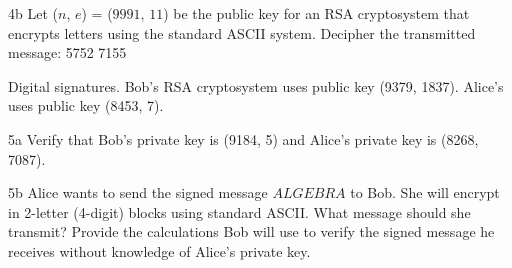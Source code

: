 
\begin{question}{4b}
Let ($n$, $e$) = ($9991$, $11$) be the public key for an RSA cryptosystem that encrypts
letters using the standard ASCII system. Decipher the transmitted message: 5752 7155
\end{question}


\begin{question}{5}
Digital signatures. Bob's RSA cryptosystem uses public key (9379, 1837). Alice's uses
public key (8453, 7).
\end{question}


\begin{question}{5a}
Verify that Bob's private key is (9184, 5) and Alice's private key is (8268, 7087).
\end{question}


\begin{question}{5b}
Alice wants to send the signed message $ALGEBRA$ to Bob. She will encrypt in
2-letter (4-digit) blocks using standard ASCII. What message should she transmit? Provide
the calculations Bob will use to verify the signed message he receives without knowledge of
Alice's private key.
\end{question}


